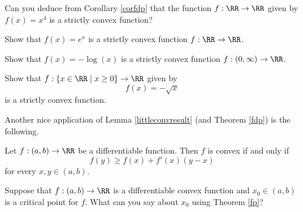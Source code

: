 \documentclass{article}
\begin{document}
\beginshex
Can you deduce from Corollary \ref{corfdp} that the function
$f: \RR \rightarrow \RR$ given by $f(x) = x^4$ is a
strictly convex function?
\endshex

\beginshex
Show that $f(x) = e^x$ is a strictly convex function $f: \RR\rightarrow \RR$.

Show that $f(x) = -\log(x)$ is a strictly convex function
$f: (0, \infty) \rightarrow \RR$.
\endshex

\beginshex
Show that $f: \{x\in \RR \mid x \geq 0\}\rightarrow \RR$ given by
$$
f(x) = -\sqrt{x}
$$
is a strictly convex function.
\endshex


Another nice application of Lemma \ref{littleconvresult} (and Theorem \ref{fdp}) is the following.

\begin{theorem}\label{fp}
  Let $f:(a, b)\rightarrow \RR$ be a differentiable function. Then $f$
  is convex if and only if
  \begin{equation*}
    f(y) \geq f(x) + f'(x)(y-x)
  \end{equation*} 
  for every $x, y\in (a, b)$.
\end{theorem}


\beginshex
Suppose that $f:(a, b)\rightarrow \RR$ is a differentiable
convex function and $x_0\in (a, b)$ is a critical point for
$f$. What can you say about $x_0$ using Theorem \ref{fp}?
\endshex
\end{document}
